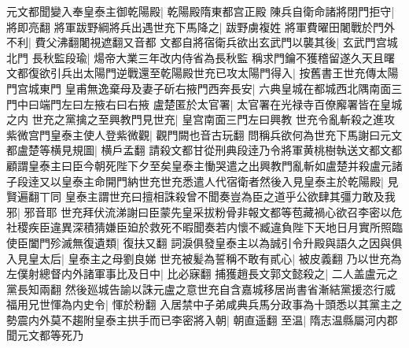 元文都聞變入奉皇泰主御乾陽殿|{
	乾陽殿隋東都宫正殿}
陳兵自衛命諸將閉門拒守|{
	將即亮翻}
將軍跋野綱將兵出遇世充下馬降之|{
	跋野虜複姓}
將軍費曜田闍戰於門外不利|{
	費父沸翻闍視遮翻又音都}
文都自將宿衛兵欲出玄武門以襲其後|{
	玄武門宫城北門}
長秋監段瑜|{
	煬帝大業三年改内侍省為長秋監}
稱求門鑰不獲稽留遂久天且曙文都復欲引兵出太陽門逆戰還至乾陽殿世充已攻太陽門得入|{
	按舊書王世充傳太陽門宫城東門}
皇甫無逸棄母及妻子斫右掖門西奔長安|{
	六典皇城在都城西北隅南面三門中曰端門左曰左掖右曰右掖}
盧楚匿於太官署|{
	太官署在光禄寺百僚廨署皆在皇城之内}
世充之黨擒之至興教門見世充|{
	皇宫南面三門左曰興教}
世充令亂斬殺之進攻紫微宫門皇泰主使人登紫微觀|{
	觀門闕也音古玩翻}
問稱兵欲何為世充下馬謝曰元文都盧楚等横見規圖|{
	横戶孟翻}
請殺文都甘從刑典段逹乃令將軍黄桃樹執送文都文都顧謂皇泰主曰臣今朝死陛下夕至矣皇泰主慟哭遣之出興教門亂斬如盧楚并殺盧元諸子段逹又以皇泰主命開門納世充世充悉遣人代宿衛者然後入見皇泰主於乾陽殿|{
	見賢遍翻丅同}
皇泰主謂世充曰擅相誅殺曾不聞奏豈為臣之道乎公欲肆其彊力敢及我邪|{
	邪音耶}
世充拜伏流涕謝曰臣蒙先皇采拔粉骨非報文都等苞藏禍心欲召李密以危社稷疾臣違異深積猜嫌臣廹於救死不暇聞奏若内懷不臧違負陛下天地日月實所照臨使臣闔門殄滅無復遺類|{
	復扶又翻}
詞淚俱發皇泰主以為誠引令升殿與語久之因與俱入見皇太后|{
	皇泰主之母劉良娣}
世充被髪為誓稱不敢有貳心|{
	被皮義翻}
乃以世充為左僕射總督内外諸軍事比及日中|{
	比必寐翻}
捕獲趙長文郭文懿殺之|{
	二人盖盧元之黨長知兩翻}
然後廵城告諭以誅元盧之意世充自含嘉城移居尚書省漸結黨援恣行威福用兄世惲為内史令|{
	惲於粉翻}
入居禁中子弟咸典兵馬分政事為十頭悉以其黨主之勢震内外莫不趨附皇泰主拱手而已李密將入朝|{
	朝直遥翻}
至温|{
	隋志温縣屬河内郡}
聞元文都等死乃


